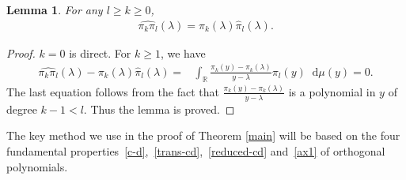 \documentclass[a4paper]{article}
\theoremstyle{plain}
\newtheorem{lem}{Lemma}
\theoremstyle{definition}
\newcommand{\dif}{\mathop{}\!\mathrm{d}}
\newcommand{\RR}{\mathbb{R}}
\begin{document}
	\begin{lem}
		For any $l\ge k\ge 0$,
		\begin{align}
			\widehat{\pi_k\pi_l}(\lambda)=\pi_k(\lambda)\widehat\pi_l(\lambda).\label{ax1}
		\end{align}
	\end{lem}
	\begin{proof}
		$k=0$ is direct. For $k\ge1$, we have
		\begin{align}
			\widehat{\pi_k\pi_l}(\lambda)-\pi_k(\lambda)\widehat\pi_l(\lambda)=&\int_\RR\frac{\pi_k(y)-\pi_k(\lambda)}{y-\lambda}\pi_l(y)\dif\mu(y)=0.
		\end{align} The last equation follows from the fact that $\frac{\pi_k(y)-\pi_k(\lambda)}{y-\lambda}$ is a polynomial in $y$ of degree $k-1<l$. Thus the lemma is proved.
	\end{proof}
	
	The key method we use in the proof of Theorem \ref{main} will be based on the four fundamental properties~\eqref{c-d},~\eqref{trans-cd},~\eqref{reduced-cd} and~\eqref{ax1} of orthogonal polynomials. 
\end{document}

